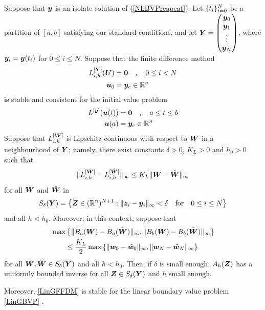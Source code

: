 \begin{theorem}
Suppose that $\bm{y}$ is an isolate solution of (\ref{NLBVPreapeat}).
Let $\displaystyle \{t_i\}_{i=0}^N$ be a partition of $[a,b]$ satisfying our
standard conditions, and let
$\displaystyle \bm{Y} = \begin{pmatrix} \bm{y}_0 \\
\bm{y}_1 \\ \vdots \\ \bm{y}_N \end{pmatrix}$,
where $\bm{y}_i = \bm{y}(t_i)$ for $0\leq i \leq N$.
Suppose that the finite difference method
\begin{equation} \label{MforLinIVP}
\begin{split}
L^{[\bm{Y}]}_{i,h} (\bm{U}) &= \bm{0} \quad , \quad 0 \leq i < N \\
\bm{u}_0 &= \bm{y}_c \in \mathbb{R}^n
\end{split}
\end{equation}
is stable and consistent for the initial value problem
\begin{equation} \label{LinIVP}
\begin{split}
L^{[\bm{y}]}(\bm{u}(t)) &= \bm{0} \quad , \quad a \leq t \leq b \\
\bm{u}(a) &= \bm{y}_c \in \mathbb{R}^n
\end{split}
\end{equation}
Suppose that $\displaystyle L^{[\bm{W}]}_{i,h}$ is Lipschitz continuous
with respect to $\bm{W}$ in a neighbourhood of $\bm{Y}$; namely,
there exist constants $\delta >0$, $K_L>0$ and $h_0 > 0$ such that
\begin{equation} \label{LipFDM}
\| L^{[\bm{W}]}_{i,h} - L^{[\tilde{\bm{W}}]}_{i,h} \|_\infty
\leq K_L \| \bm{W} - \tilde{\bm{W}} \|_\infty
\end{equation}
for all $\bm{W}$ and $\tilde{\bm{W}}$ in
\[
S_\delta(\bm{Y}) = \left\{ \bm{Z} \in (\mathbb{R}^n)^{N+1} :
\| \bm{z}_i - \bm{y}_i \|_\infty < \delta
\quad \text{for} \quad 0 \leq i \leq N \right\}
\]
and all $h < h_0$.  Moreover, in this context, suppose that
\begin{equation} \label{Cont_BC}
\begin{split}
& \max \left\{ \| B_a(\bm{W}) - B_a(\tilde{\bm{W}}) \|_\infty ,
\| B_b(\bm{W}) - B_b(\tilde{\bm{W}}) \|_\infty \right\} \\
&\qquad \leq \frac{K_L}{2} \max \left\{\| \bm{w}_0-\tilde{\bm{w}}_0 \|_\infty,
\| \bm{w}_N-\tilde{\bm{w}}_N \|_\infty \right\}
\end{split}
\end{equation}
for all $\bm{W}, \tilde{\bm{W}} \in S_\delta(\bm{Y})$ and all $h < h_0$.
Then, if $\delta$ is small enough, $A_h(\bm{Z})$ has a uniformly
bounded inverse for all $\bm{Z} \in S_\delta(\bm{Y})$ and $h$
small enough.

Moreover, \ref{LinGFFDM} is stable for the linear boundary value problem
\ref{LinGBVP} \footnotemark.
\label{FDM_stable}
\end{theorem}


